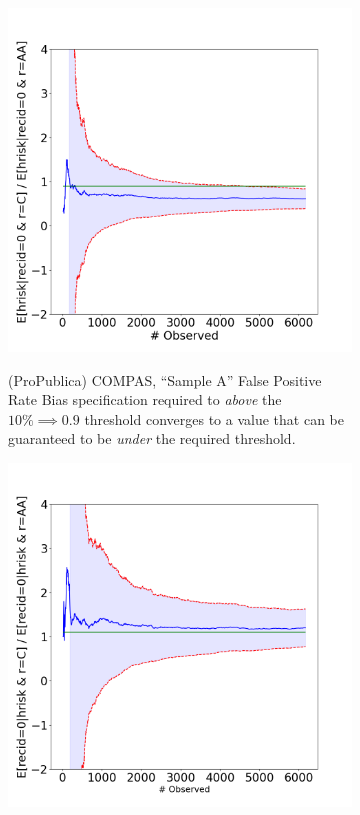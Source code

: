 \begin{figure}
    \centering
    \begin{subfigure}{0.6\linewidth}
        \centering
        \includegraphics[width=0.8\linewidth,alt={Confidence line plots showing that the claims made by Propublica reach the required uncertainty threshold with the available samples.}]{avoir/images/compas-propublica-et.png}
        \caption{(ProPublica) COMPAS, ``Sample A'' False Positive Rate Bias specification required to \emph{above} the $10\% \implies 0.9$ threshold converges to a value that can be guaranteed to be \emph{under} the required threshold.}
        \label{fig:casestudy:compas:propublica}
    \end{subfigure} 
    \begin{subfigure}{0.6\linewidth}
        \centering
        \includegraphics[width=0.8\linewidth,alt={Confidence line plots showing that the claims made by Northpointe do not reach the required uncertainty threshold with the available samples}]{avoir/images/compas-northpointe-et.png}

\end{subfigure}
\end{figure}

